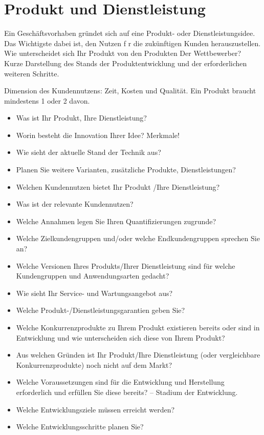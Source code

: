\chapter{Produkt und Dienstleistung}

Ein Geschäftsvorhaben gründet sich auf eine Produkt- oder Dienstleistungsidee.
Das Wichtigste dabei ist, den Nutzen f r die zukünftigen Kunden herauszustellen.
Wie unterscheidet sich Ihr Produkt von den Produkten
Der Wettbewerber?
Kurze Darstellung des Stands der Produktentwicklung und der erforderlichen weiteren Schritte.

Dimension des Kundennutzens: Zeit, Kosten und Qualität. Ein Produkt braucht mindestens 1 oder 2 davon.

\begin{itemize}
\item Was ist Ihr Produkt, Ihre Dienstleistung?
\item Worin besteht die Innovation Ihrer Idee? Merkmale!
\item Wie sieht der aktuelle Stand der Technik aus?
\item Planen Sie weitere Varianten, zusätzliche Produkte, Dienstleistungen?
\item Welchen Kundennutzen bietet Ihr Produkt /Ihre Dienstleistung?
\item Was ist der relevante Kundennutzen?
\item Welche Annahmen legen Sie Ihren Quantifizierungen zugrunde?
\item Welche Zielkundengruppen und/oder welche Endkundengruppen sprechen Sie an?
\item Welche Versionen Ihres Produkts/Ihrer Dienstleistung sind für welche Kundengruppen und Anwendungsarten gedacht?
\item Wie sieht Ihr Service- und Wartungsangebot aus?
\item Welche Produkt-/Dienstleistungsgarantien geben Sie?
\item Welche Konkurrenzprodukte zu Ihrem Produkt existieren bereits oder sind in Entwicklung und wie unterscheiden sich diese von Ihrem Produkt?
\item Aus welchen Gründen ist Ihr Produkt/Ihre Dienstleistung (oder vergleichbare Konkurrenzprodukte) noch nicht auf dem Markt?
\item Welche Voraussetzungen sind für die Entwicklung und Herstellung erforderlich und erfüllen Sie diese bereits? – Stadium der Entwicklung.
\item Welche Entwicklungsziele müssen erreicht werden? 
\item Welche Entwicklungsschritte planen Sie?
\end{itemize}